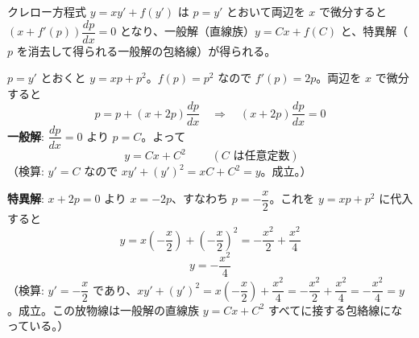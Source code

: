 
クレロー方程式 $y = xy' + f(y')$ は $p = y'$ とおいて両辺を $x$ で微分すると $(x + f'(p))\dfrac{dp}{dx} = 0$ となり、一般解（直線族）$y = Cx + f(C)$ と、特異解（$p$ を消去して得られる一般解の包絡線）が得られる。

$p = y'$ とおくと $y = xp + p^{2}$。$f(p) = p^{2}$ なので $f'(p) = 2p$。両辺を $x$ で微分すると
\[
p = p + (x + 2p)\frac{dp}{dx}
\quad\Longrightarrow\quad
(x + 2p)\frac{dp}{dx} = 0
\]
\textbf{一般解}: $\dfrac{dp}{dx} = 0$ より $p = C$。よって
\[
\boxed{\; y = Cx + C^{2} \;}
\qquad (C \text{ は任意定数})
\]
（検算: $y' = C$ なので $xy' + (y')^{2} = xC + C^{2} = y$。成立。）

\textbf{特異解}: $x + 2p = 0$ より $x = -2p$、すなわち $p = -\dfrac{x}{2}$。これを $y = xp+p^{2}$ に代入すると
\[
y = x\left(-\frac{x}{2}\right) + \left(-\frac{x}{2}\right)^{2}
= -\frac{x^{2}}{2} + \frac{x^{2}}{4}
\]
\[
\boxed{\; y = -\frac{x^{2}}{4} \;}
\]
（検算: $y' = -\dfrac{x}{2}$ であり、$xy' + (y')^{2} = x\left(-\dfrac{x}{2}\right) + \dfrac{x^{2}}{4} = -\dfrac{x^{2}}{2}+\dfrac{x^{2}}{4} = -\dfrac{x^{2}}{4} = y$。成立。この放物線は一般解の直線族 $y=Cx+C^2$ すべてに接する包絡線になっている。）
